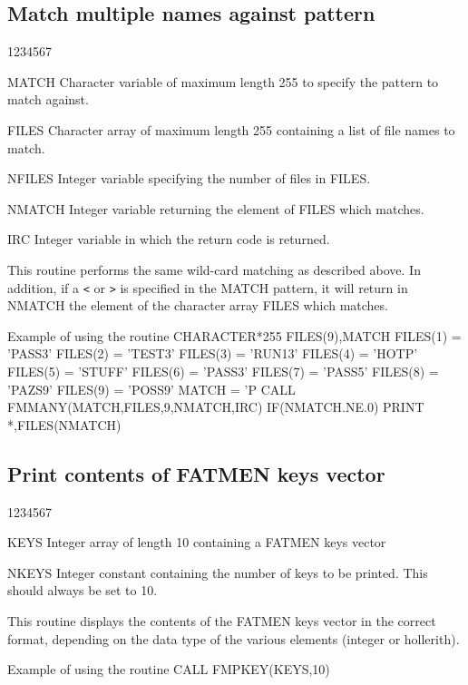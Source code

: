 \subsection{Match multiple names against pattern}
\begin{DLtt}{1234567}
\item[MATCH ]
Character variable of maximum length 255 to specify the
pattern to match against.
\item[FILES]
Character array of maximum length 255 containing a list of file
names to match.
\item[NFILES]
Integer variable specifying the number of files in FILES.
\item[NMATCH]
Integer variable returning the element of FILES which matches.
\item[IRC ]
Integer variable in which the return code is returned.
\end{DLtt}
\par
This routine performs the same wild-card matching as 
described above. In addition, if a {\tt<} or {\tt>} is specified in the
MATCH pattern, it will return in NMATCH the element of the
character array FILES which matches.
\begin{XMPt}{Example of using the routine \protect{}}
      CHARACTER*255 FILES(9),MATCH
      FILES(1) = 'PASS3'
      FILES(2) = 'TEST3'
      FILES(3) = 'RUN13'
      FILES(4) = 'HOTP'
      FILES(5) = 'STUFF'
      FILES(6) = 'PASS3'
      FILES(7) = 'PASS5'
      FILES(8) = 'PAZS9'
      FILES(9) = 'POSS9'
      MATCH    = 'P%
      CALL FMMANY(MATCH,FILES,9,NMATCH,IRC)
      IF(NMATCH.NE.0) PRINT *,FILES(NMATCH)
\end{XMPt}
\subsection{Print contents of FATMEN keys vector}
\begin{DLtt}{1234567}
\item[KEYS]
Integer array of length 10 containing a FATMEN keys vector
\item[NKEYS]
Integer constant containing the number of keys to be printed.
This should always be set to 10.
\end{DLtt}
\par
This routine displays the contents of the FATMEN keys vector in
the correct format, depending on the data type of the various elements
(integer or hollerith).
\begin{XMPt}{Example of using the \protect{} routine}
      CALL FMPKEY(KEYS,10)
\end{XMPt}

